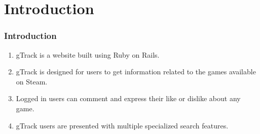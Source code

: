 \section{Introduction}
\begin{frame}
\frametitle{Introduction}

\begin{enumerate}[<+->]
	\setlength\itemsep{1em}
	\item gTrack is a website built using Ruby on Rails.
	\item gTrack is designed for users to get information related to the games available on Steam.
	\item Logged in users can comment and express their like or dislike about any game.
	\item gTrack users are presented with multiple specialized search features. 
\end{enumerate}
\end{frame}
